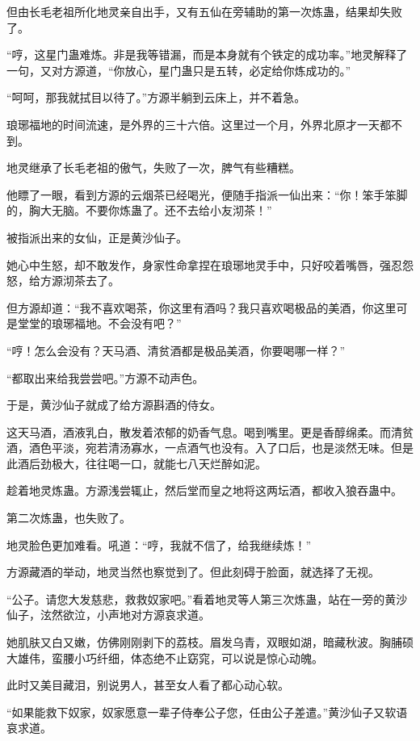 \begin{this_body}
但由长毛老祖所化地灵亲自出手，又有五仙在旁辅助的第一次炼蛊，结果却失败了。

“哼，这星门蛊难炼。非是我等错漏，而是本身就有个铁定的成功率。”地灵解释了一句，又对方源道，“你放心，星门蛊只是五转，必定给你炼成功的。”

“呵呵，那我就拭目以待了。”方源半躺到云床上，并不着急。

琅琊福地的时间流速，是外界的三十六倍。这里过一个月，外界北原才一天都不到。

地灵继承了长毛老祖的傲气，失败了一次，脾气有些糟糕。

他瞟了一眼，看到方源的云烟茶已经喝光，便随手指派一仙出来：“你！笨手笨脚的，胸大无脑。不要你炼蛊了。还不去给小友沏茶！”

被指派出来的女仙，正是黄沙仙子。

她心中生怒，却不敢发作，身家性命拿捏在琅琊地灵手中，只好咬着嘴唇，强忍怨怒，给方源沏茶去了。

但方源却道：“我不喜欢喝茶，你这里有酒吗？我只喜欢喝极品的美酒，你这里可是堂堂的琅琊福地。不会没有吧？”

“哼！怎么会没有？天马酒、清贫酒都是极品美酒，你要喝哪一样？”

“都取出来给我尝尝吧。”方源不动声色。

于是，黄沙仙子就成了给方源斟酒的侍女。

这天马酒，酒液乳白，散发着浓郁的奶香气息。喝到嘴里。更是香醇绵柔。而清贫酒，酒色平淡，宛若清汤寡水，一点酒气也没有。入了口后，也是淡然无味。但是此酒后劲极大，往往喝一口，就能七八天烂醉如泥。

趁着地灵炼蛊。方源浅尝辄止，然后堂而皇之地将这两坛酒，都收入狼吞蛊中。

第二次炼蛊，也失败了。

地灵脸色更加难看。吼道：“哼，我就不信了，给我继续炼！”

方源藏酒的举动，地灵当然也察觉到了。但此刻碍于脸面，就选择了无视。

“公子。请您大发慈悲，救救奴家吧。”看着地灵等人第三次炼蛊，站在一旁的黄沙仙子，泫然欲泣，小声地对方源哀求道。

她肌肤又白又嫩，仿佛刚刚剥下的荔枝。眉发乌青，双眼如湖，暗藏秋波。胸脯硕大雄伟，蛮腰小巧纤细，体态绝不止窈窕，可以说是惊心动魄。

此时又美目藏泪，别说男人，甚至女人看了都心动心软。

“如果能救下奴家，奴家愿意一辈子侍奉公子您，任由公子差遣。”黄沙仙子又软语哀求道。


\end{this_body}
